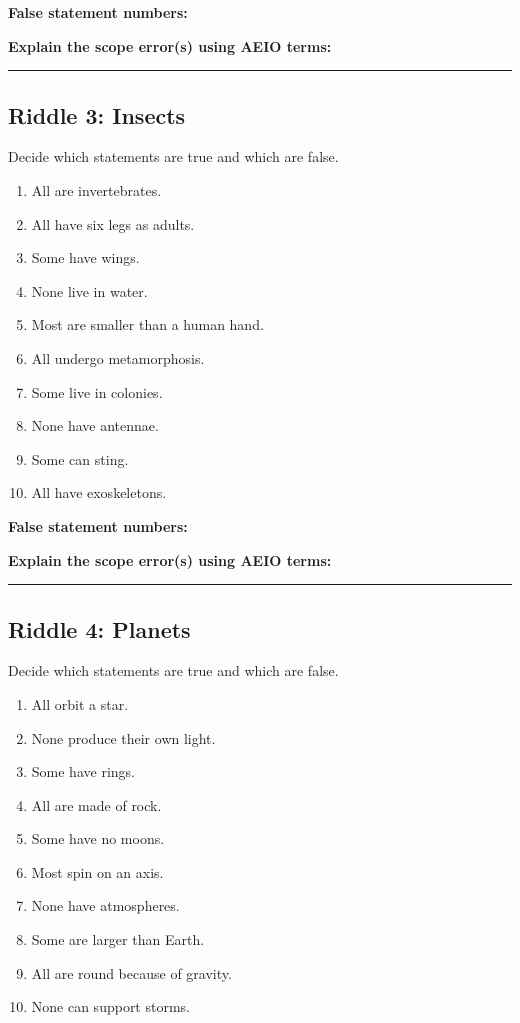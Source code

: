 \documentclass[12pt]{article}
\newcommand{\studentline}{\par\vspace{0.60em}\hrule\vspace{0.64em}}
\begin{document}
\textbf{False statement numbers:} \hrulefill

\textbf{Explain the scope error(s) using AEIO terms:}\studentline

\Needspace{0.25\textheight}

\subsection*{Riddle 3: Insects}

Decide which statements are true and which are false.

\begin{enumerate}[leftmargin=*, itemsep=0.1em]
\item All are invertebrates.
\item All have six legs as adults.
\item Some have wings.
\item None live in water.
\item Most are smaller than a human hand.
\item All undergo metamorphosis.
\item Some live in colonies.
\item None have antennae.
\item Some can sting.
\item All have exoskeletons.
\end{enumerate}

\textbf{False statement numbers:} \hrulefill

\textbf{Explain the scope error(s) using AEIO terms:}\studentline

\Needspace{0.25\textheight}

\subsection*{Riddle 4: Planets}

Decide which statements are true and which are false.

\begin{enumerate}[leftmargin=*, itemsep=0.1em]
\item All orbit a star.
\item None produce their own light.
\item Some have rings.
\item All are made of rock.
\item Some have no moons.
\item Most spin on an axis.
\item None have atmospheres.
\item Some are larger than Earth.
\item All are round because of gravity.
\item None can support storms.
\end{enumerate}
\end{document}
